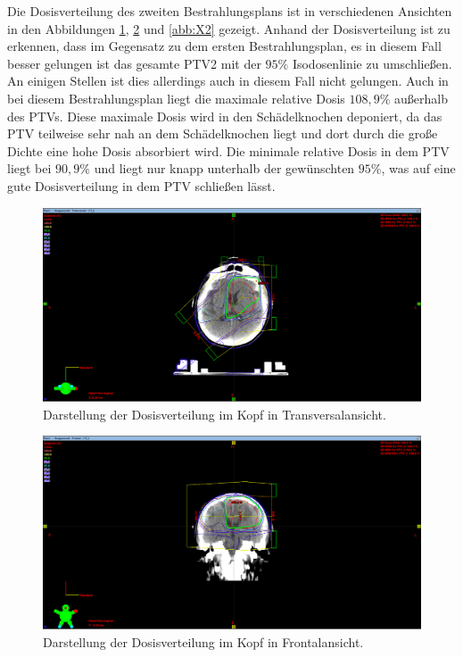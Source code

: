 Die Dosisverteilung des zweiten Bestrahlungsplans ist in verschiedenen Ansichten in den
Abbildungen \ref{abb:Z2}, \ref{abb:Y2} und \ref{abb:X2} gezeigt. Anhand der Dosisverteilung ist
zu erkennen, dass im Gegensatz zu dem ersten Bestrahlungsplan, es in diesem Fall besser gelungen
ist das gesamte PTV2 mit der $95\%$ Isodosenlinie zu umschließen. An einigen Stellen ist dies allerdings auch in
diesem Fall nicht gelungen. Auch in bei diesem Bestrahlungsplan liegt die maximale relative Dosis $108,9\%$ außerhalb des
PTVs. Diese maximale Dosis wird in den Schädelknochen deponiert, da das PTV teilweise sehr nah an dem Schädelknochen liegt und dort durch die
große Dichte eine hohe Dosis absorbiert wird. Die minimale relative Dosis in dem PTV liegt bei $90,9\%$ und liegt nur knapp unterhalb der gewünschten
$95\%$, was auf eine gute Dosisverteilung in dem PTV schließen lässt.


\begin{figure}[H]
  \centering
  \includegraphics[width=\textwidth]{Bilder/Teilhirn2_Z.png}
  \caption{Darstellung der Dosisverteilung im Kopf in Transversalansicht.}
  \label{abb:Z2}
\end{figure}

\begin{figure}[H]
  \centering
  \includegraphics[width=\textwidth]{Bilder/Teilhirn2_Y.png}
  \caption{Darstellung der Dosisverteilung im Kopf in Frontalansicht.}
  \label{abb:Y2}
\end{figure}

